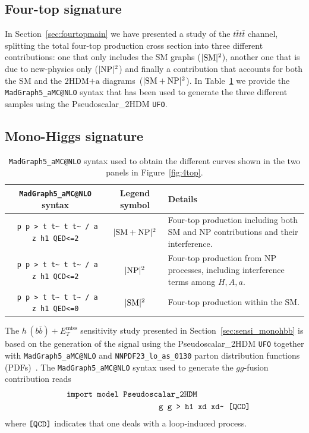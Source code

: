 \documentclass[a4paper, 11pt,notoc]{article}
\newcommand{\MET}{\ensuremath{E_T^\mathrm{miss}}\xspace}
\newcommand{\hdma}{\ensuremath{\textrm{2HDM+a}}\xspace}
\begin{document}
\subsection{Four-top signature}

In Section~\ref{sec:fourtopmain} we have presented a study of the $t \bar t t \bar t$ channel, splitting the  total four-top production cross section into three different contributions: one that only includes the SM graphs ($|{\rm SM}|^2$), another one that is due to new-physics only ($|{\rm NP}|^2$) and finally a contribution that accounts for both the SM and the \hdma diagrams~($|{\rm SM} + {\rm NP}|^2$). In Table~\ref{tab-dmhf-4tops} we provide the {\tt MadGraph5\_aMC@NLO} syntax that has been used to generate the three different samples using the Pseudoscalar\_2HDM {\tt UFO}. 

\subsection{Mono-Higgs signature}

\begin{table}[t!]
\begin{tabular}{ccm{50mm}}
\toprule
 {\tt MadGraph5\_aMC@NLO} syntax & Legend symbol & Details \\\midrule
\verb| p p > t t~ t t~ / a z h1 QED<=2|& $|{\rm SM}+{\rm NP}|^2$ & Four-top
production including both SM and NP contributions and their
interference. \\\midrule
\verb| p p > t t~ t t~ / a z h1 QCD<=2|& $|{\rm NP}|^2$ & Four-top
production from NP processes, including interference terms among
$H,A,a$. \\\midrule
\verb| p p > t t~ t t~ / a z h1 QED<=0|& $|{\rm SM}|^2$ & Four-top 
production within the SM.\\
\bottomrule
\end{tabular}
\vspace{4mm} 
\caption{{\tt MadGraph5\_aMC@NLO} syntax used to obtain the different curves shown in the two panels in Figure~\ref{fig:4top}.}
\label{tab-dmhf-4tops}
\end{table}

The $h \, (b \bar b) + \MET$ sensitivity study presented in Section~\ref{sec:sensi_monohbb} is based on the generation of the signal using the Pseudoscalar\_2HDM {\tt UFO} together with {\tt MadGraph5\_aMC@NLO} and {\tt NNPDF23\_lo\_as\_0130} parton distribution functions (PDFs)~\cite{Ball:2012cx}. The {\tt MadGraph5\_aMC@NLO}  syntax used to generate the $gg$-fusion contribution reads 
\begin{eqnarray}
&& \verb| import model Pseudoscalar_2HDM | \hspace{2.25cm} \nonumber \\
&& \verb| g g > h1 xd xd~ [QCD] | \nonumber 
\end{eqnarray}
where  $\verb|[QCD]|$ indicates that one deals with a loop-induced process. 
\end{document}
